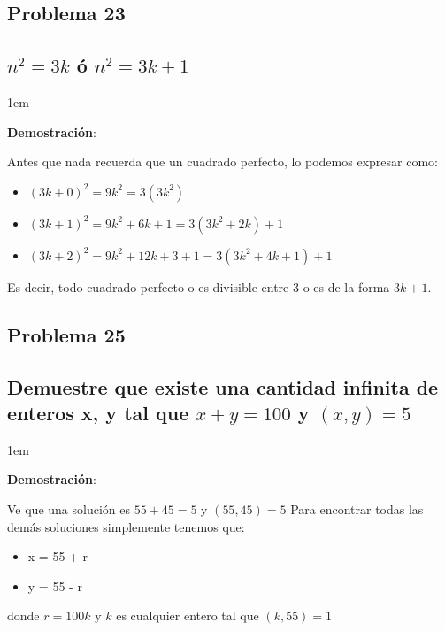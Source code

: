 \documentclass[12pt, fleqn]{article}                             %
\newenvironment{SmallIndentation}[1][0.75em]                    %
    {\begin{adjustwidth}{#1}{}\begin{footnotesize}}                 %
    {\end{footnotesize}\end{adjustwidth}}                           %
\begin{document}
    \subsection{Problema 23}
    \subsection*{$n^2 = 3k$ ó $n^2 = 3k + 1$}


        \begin{SmallIndentation}[1em]
            \textbf{Demostración}:

            Antes que nada recuerda que un cuadrado perfecto, lo podemos expresar como:
            \begin{itemize}
                \item $(3k+0)^2 = 9k^2 = 3(3k^2)$
                \item $(3k+1)^2 = 9k^2 + 6k + 1 = 3(3k^2 + 2k) + 1$
                \item $(3k+2)^2 = 9k^2 + 12k + 3 +1 = 3(3k^2 + 4k + 1) + 1$
            \end{itemize}

            Es decir, todo cuadrado perfecto o es divisible entre 3 o es de la forma
            $3k+1$.
            
        \end{SmallIndentation}



    \subsection{Problema 25}
    \subsection*{Demuestre que existe una cantidad infinita de enteros
        x, y tal que $x+y=100$ y $(x,y)=5$}


        \begin{SmallIndentation}[1em]
            \textbf{Demostración}:

            Ve que una solución es $55 + 45 = 5$ y $(55, 45)=5$
            Para encontrar todas las demás soluciones simplemente 
            tenemos que:
            \begin{itemize}
                \item x = 55 + r
                \item y = 55 - r
            \end{itemize}

            donde $r = 100k$ y $k$ es cualquier entero tal que $(k, 55) = 1$
        \end{SmallIndentation}
\end{document}
